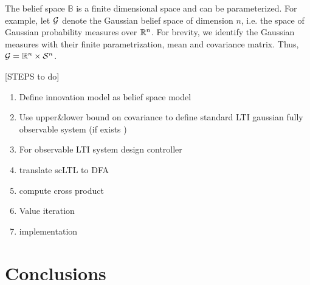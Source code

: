 \documentclass{ifacconf}
\newcommand{\red}[1]{{\color{red} #1}}
\begin{document}
 \noindent{\textbf{}}
The belief space $\mathbb{B}$ is  a finite dimensional space and can be parameterized. For example, let $\mathcal{G}$ denote the Gaussian belief space
    of dimension $n$, i.e. the space of Gaussian
    probability measures over $\mathbb{R}^n$.
    For brevity, we identify the Gaussian measures
    with their finite parametrization, mean and
    covariance matrix.
     Thus,
    $\mathcal{G} =  \mathbb{R}^n \times  \mathcal S^n$.
    
    \red{[STEPS to do]
  \begin{enumerate}
  	\item Define innovation model as belief space model
  	\item Use upper\&lower bound on covariance to define standard LTI gaussian fully observable system (if exists )
  	\item For observable LTI system design controller
  	\item translate scLTL to DFA
  	\item compute cross product
  	\item Value iteration
  	\item implementation
  \end{enumerate}
  
  
  }
    
  
\section{Conclusions}




\end{document}
